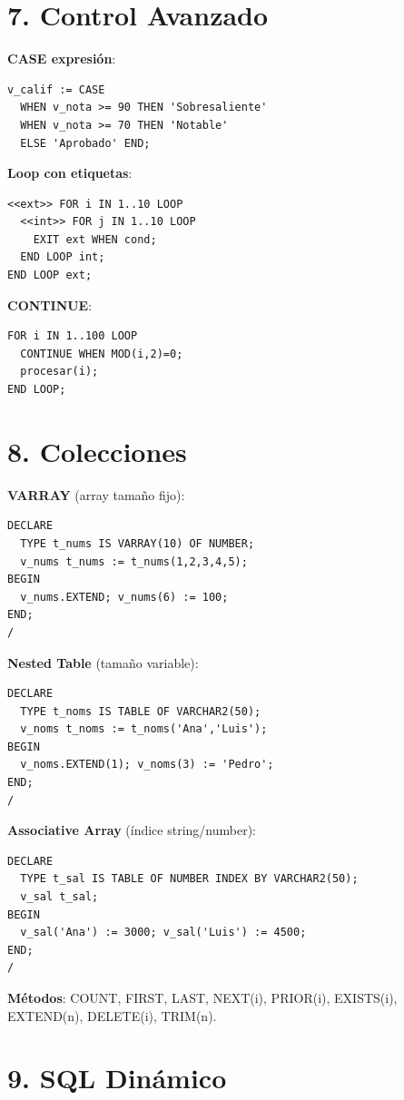 \documentclass[8pt,a4paper,twocolumn]{article}
\begin{document}
\section*{7. Control Avanzado}

\textbf{CASE expresión}:
\begin{lstlisting}
v_calif := CASE
  WHEN v_nota >= 90 THEN 'Sobresaliente'
  WHEN v_nota >= 70 THEN 'Notable'
  ELSE 'Aprobado' END;
\end{lstlisting}

\textbf{Loop con etiquetas}:
\begin{lstlisting}
<<ext>> FOR i IN 1..10 LOOP
  <<int>> FOR j IN 1..10 LOOP
    EXIT ext WHEN cond;
  END LOOP int;
END LOOP ext;
\end{lstlisting}

\textbf{CONTINUE}:
\begin{lstlisting}
FOR i IN 1..100 LOOP
  CONTINUE WHEN MOD(i,2)=0;
  procesar(i);
END LOOP;
\end{lstlisting}

\section*{8. Colecciones}

\textbf{VARRAY} (array tamaño fijo):
\begin{lstlisting}
DECLARE
  TYPE t_nums IS VARRAY(10) OF NUMBER;
  v_nums t_nums := t_nums(1,2,3,4,5);
BEGIN
  v_nums.EXTEND; v_nums(6) := 100;
END;
/
\end{lstlisting}

\textbf{Nested Table} (tamaño variable):
\begin{lstlisting}
DECLARE
  TYPE t_noms IS TABLE OF VARCHAR2(50);
  v_noms t_noms := t_noms('Ana','Luis');
BEGIN
  v_noms.EXTEND(1); v_noms(3) := 'Pedro';
END;
/
\end{lstlisting}

\textbf{Associative Array} (índice string/number):
\begin{lstlisting}
DECLARE
  TYPE t_sal IS TABLE OF NUMBER INDEX BY VARCHAR2(50);
  v_sal t_sal;
BEGIN
  v_sal('Ana') := 3000; v_sal('Luis') := 4500;
END;
/
\end{lstlisting}

\textbf{Métodos}: COUNT, FIRST, LAST, NEXT(i), PRIOR(i), EXISTS(i), EXTEND(n), DELETE(i), TRIM(n).

\section*{9. SQL Dinámico}
\end{document}
